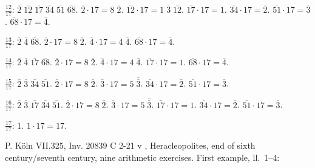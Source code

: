 \documentclass{article}
\begin{document}
$\frac{12}{17}$: $\overline{2} \; \overline{12} \; \overline{17} \; \overline{34} \; \overline{51} \; \overline{68}$.
$\overline{2} \cdot 17 = 8 \; \overline{2}$.
$\overline{12} \cdot 17 = 1 \; \overline{3} \; \overline{12}$.
$\overline{17} \cdot 17 = 1$.
$\overline{34} \cdot 17 = \overline{2}$.
$\overline{51} \cdot 17 = \overline{3}$.
$\overline{68} \cdot 17 = \overline{4}$.

$\frac{13}{17}$: $\overline{2} \; \overline{4} \; \overline{68}$.
$\overline{2} \cdot 17 = 8 \; \overline{2}$.
$\overline{4} \cdot 17 = 4 \; \overline{4}$.
$\overline{68} \cdot 17 = \overline{4}$.

$\frac{14}{17}$: $\overline{2} \; \overline{4} \; \overline{17} \; \overline{68}$.
$\overline{2} \cdot 17 = 8 \; \overline{2}$.
$\overline{4} \cdot 17 = 4 \; \overline{4}$.
$\overline{17} \cdot 17 = 1$.
$\overline{68} \cdot 17 = \overline{4}$.

$\frac{15}{17}$: $\overline{2} \; \overline{3} \; \overline{34} \; \overline{51}$.
$\overline{2} \cdot 17 = 8 \; \overline{2}$.
$\overline{3} \cdot 17 = 5 \; \overline{\overline{3}}$.
$\overline{34} \cdot 17 = \overline{2}$.
$\overline{51} \cdot 17 = \overline{3}$.

$\frac{16}{17}$: $\overline{2} \; \overline{3} \; \overline{17} \; \overline{34} \; \overline{51}$.
$\overline{2} \cdot 17 = 8 \; \overline{2}$.
$\overline{3} \cdot 17 = 5 \; \overline{\overline{3}}$.
$\overline{17} \cdot 17 = 1$.
$\overline{34} \cdot 17 = \overline{2}$.
$\overline{51} \cdot 17 = \overline{3}$.

$\frac{17}{17}$: 1.
$1 \cdot 17= 17$.









P. K\"oln VII.325, Inv. 20839 C 2-21 v \cite[pp.~166--174]{koln7}, Heracleopolites, end of sixth century/seventh century, nine arithmetic exercises.
First example, ll.~1--4:
\end{document}

